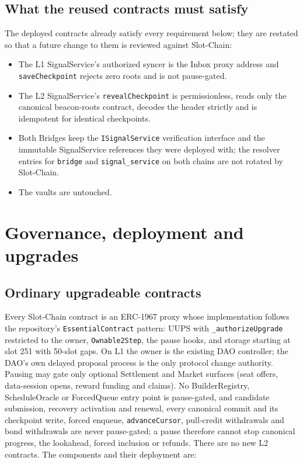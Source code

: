 \documentclass[a4paper,11pt]{article}
\newcommand{\code}[1]{\nolinkurl{#1}}
\begin{document}
\subsection{What the reused contracts must satisfy}

The deployed contracts already satisfy every requirement below; they are
restated so that a future change to them is reviewed against Slot-Chain:
\begin{itemize}
\item The L1 SignalService's authorized syncer is the Inbox proxy address and
  \code{saveCheckpoint} rejects zero roots and is not pause-gated.
\item The L2 SignalService's \code{revealCheckpoint} is permissionless,
  reads only the canonical beacon-roots contract, decodes the header strictly
  and is idempotent for identical checkpoints.
\item Both Bridges keep the \code{ISignalService} verification interface and
  the immutable SignalService references they were deployed with; the resolver
  entries for \code{bridge} and \code{signal_service} on both chains are not
  rotated by Slot-Chain.
\item The vaults are untouched.
\end{itemize}

\section{Governance, deployment and upgrades}\label{sec:governance}

\subsection{Ordinary upgradeable contracts}

Every Slot-Chain contract is an ERC-1967 proxy whose implementation follows
the repository's \code{EssentialContract} pattern: UUPS with
\code{_authorizeUpgrade} restricted to the owner, \code{Ownable2Step}, the
pause hooks, and storage starting at slot 251 with 50-slot gaps.  On L1 the
owner is the existing DAO controller; the DAO's own delayed proposal process is
the only protocol change authority.  Pausing may gate only optional
Settlement and Market surfaces (seat offers, data-session opens, reward
funding and claims).  No BuilderRegistry, ScheduleOracle or ForcedQueue entry
point is pause-gated, and candidate submission, recovery activation and
renewal, every canonical commit and its checkpoint write, forced enqueue,
\code{advanceCursor}, pull-credit withdrawals and bond withdrawals are never
pause-gated; a pause therefore cannot stop canonical progress, the lookahead,
forced inclusion or refunds.  There are no new L2 contracts.  The components and
their deployment are:
\end{document}
